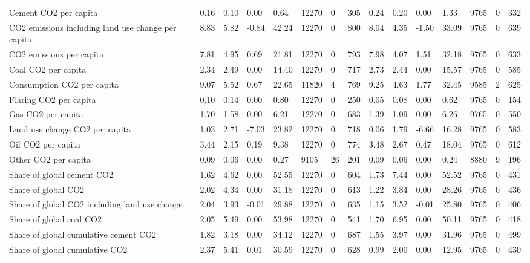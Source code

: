 \begin{longtable}{lllllllllllllll}
Cement CO2 per capita & 0.16 & 0.10 & 0.00 & 0.64 & 12270 & 0 & 305 & 0.24 & 0.20 & 0.00 & 1.33 & 9765 & 0 & 332\\
CO2 emissions including land use change per capita & 8.83 & 5.82 & -0.84 & 42.24 & 12270 & 0 & 800 & 8.04 & 4.35 & -1.50 & 33.09 & 9765 & 0 & 639\\
CO2 emissions per capita & 7.81 & 4.95 & 0.69 & 21.81 & 12270 & 0 & 793 & 7.98 & 4.07 & 1.51 & 32.18 & 9765 & 0 & 633\\
Coal CO2 per capita & 2.34 & 2.49 & 0.00 & 14.40 & 12270 & 0 & 717 & 2.73 & 2.44 & 0.00 & 15.57 & 9765 & 0 & 585\\
\addlinespace
Consumption CO2 per capita & 9.07 & 5.52 & 0.67 & 22.65 & 11820 & 4 & 769 & 9.25 & 4.63 & 1.77 & 32.45 & 9585 & 2 & 625\\
Flaring CO2 per capita & 0.10 & 0.14 & 0.00 & 0.80 & 12270 & 0 & 250 & 0.05 & 0.08 & 0.00 & 0.62 & 9765 & 0 & 154\\
Gas CO2 per capita & 1.70 & 1.58 & 0.00 & 6.21 & 12270 & 0 & 683 & 1.39 & 1.09 & 0.00 & 6.26 & 9765 & 0 & 550\\
Land use change CO2 per capita & 1.03 & 2.71 & -7.03 & 23.82 & 12270 & 0 & 718 & 0.06 & 1.79 & -6.66 & 16.28 & 9765 & 0 & 583\\
Oil CO2 per capita & 3.44 & 2.15 & 0.19 & 9.38 & 12270 & 0 & 774 & 3.48 & 2.67 & 0.47 & 18.04 & 9765 & 0 & 612\\
\addlinespace
Other CO2 per capita & 0.09 & 0.06 & 0.00 & 0.27 & 9105 & 26 & 201 & 0.09 & 0.06 & 0.00 & 0.24 & 8880 & 9 & 196\\
Share of global cement CO2 & 1.62 & 4.62 & 0.00 & 52.55 & 12270 & 0 & 604 & 1.73 & 7.44 & 0.00 & 52.52 & 9765 & 0 & 431\\
Share of global CO2 & 2.02 & 4.34 & 0.00 & 31.18 & 12270 & 0 & 613 & 1.22 & 3.84 & 0.00 & 28.26 & 9765 & 0 & 436\\
Share of global CO2 including land use change & 2.04 & 3.93 & -0.01 & 29.88 & 12270 & 0 & 635 & 1.15 & 3.52 & -0.01 & 25.80 & 9765 & 0 & 406\\
Share of global coal CO2 & 2.05 & 5.49 & 0.00 & 53.98 & 12270 & 0 & 541 & 1.70 & 6.95 & 0.00 & 50.11 & 9765 & 0 & 418\\
\addlinespace
Share of global cumulative cement CO2 & 1.82 & 3.18 & 0.00 & 34.12 & 12270 & 0 & 687 & 1.55 & 3.97 & 0.00 & 31.96 & 9765 & 0 & 499\\
Share of global cumulative CO2 & 2.37 & 5.41 & 0.01 & 30.59 & 12270 & 0 & 628 & 0.99 & 2.00 & 0.00 & 12.95 & 9765 & 0 & 430\\

\end{longtable}
